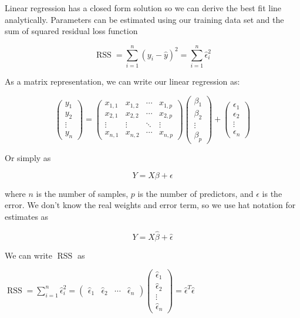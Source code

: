 Linear regression has a closed form solution so we can derive the best fit line analytically. Parameters can be estimated using our training data set and the sum of squared residual loss function

\[\operatorname{RSS} = \sum_{i=1}^n(y_i - \hat y)^2 = \sum_{i = 1}^n \hat\epsilon_i^2\]

As a matrix representation, we can write our linear regression as:

\[\begin{pmatrix} y_1 \\ y_2 \\ \vdots \\ y_n \end{pmatrix} =
 \begin{pmatrix}
  x_{1,1} & x_{1,2} & \cdots & x_{1,p} \\
  x_{2,1} & x_{2,2} & \cdots & x_{2,p} \\
  \vdots  & \vdots  & \ddots & \vdots  \\
  x_{n,1} & x_{n,2} & \cdots & x_{n,p}
 \end{pmatrix}
 \begin{pmatrix} \beta_1 \\ \beta_2 \\ \vdots \\ \beta_p \end{pmatrix} + \begin{pmatrix} \epsilon_1 \\ \epsilon_2 \\ \vdots \\ \epsilon_n \end{pmatrix}\]

Or simply as

\[Y = X \beta + \epsilon\]

where \(n\) is the number of samples, \(p\) is the number of predictors, and \(\epsilon\) is the error. We don't know the real weights and error term, so we use hat notation for estimates as

\begin{equation}Y = X \hat\beta + \hat\epsilon \tag{4.1}\end{equation}

We can write \(\operatorname{RSS}\) as

\(\operatorname{RSS} = \sum_{i = 1}^n \hat\epsilon_i^2 = \begin{pmatrix} \hat\epsilon_1 & \hat\epsilon_2 & \cdots & \hat\epsilon_n \end{pmatrix} \begin{pmatrix} \hat\epsilon_1 \\ \hat\epsilon_2 \\ \vdots \\ \hat\epsilon_n \end{pmatrix} = \hat\epsilon^T\hat\epsilon\)\\

